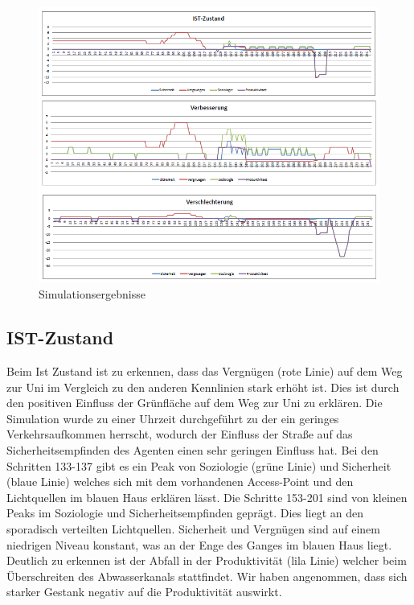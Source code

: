 \documentclass[10pt]{scrartcl}
\begin{document}
	\begin{figure}[H]
                \includegraphics[width=\textwidth]{Diagramme/Diagramme.png}
        \caption{Simulationsergebnisse}
        \label{img:Diagramme}
	\end{figure} 

\subsection{IST-Zustand}
Beim Ist Zustand ist zu erkennen, dass das Vergnügen (rote Linie) auf dem Weg zur Uni im Vergleich zu den anderen Kennlinien stark erhöht ist. Dies ist durch den positiven Einfluss der Grünfläche auf dem Weg zur Uni zu erklären. Die Simulation wurde zu einer Uhrzeit durchgeführt zu der ein geringes Verkehrsaufkommen herrscht, wodurch der Einfluss der Straße auf das Sicherheitsempfinden des Agenten einen sehr geringen Einfluss hat. Bei den Schritten 133-137 gibt es ein Peak von Soziologie (grüne Linie) und Sicherheit (blaue Linie) welches sich mit dem vorhandenen Access-Point und den Lichtquellen im blauen Haus erklären lässt. Die Schritte 153-201 sind von kleinen Peaks im Soziologie und Sicherheitsempfinden geprägt. Dies liegt an den sporadisch verteilten Lichtquellen. Sicherheit und Vergnügen sind auf einem niedrigen Niveau konstant, was an der Enge des Ganges im blauen Haus liegt. Deutlich zu erkennen ist der Abfall in der Produktivität (lila Linie) welcher beim Überschreiten des Abwasserkanals stattfindet. Wir haben angenommen, dass sich starker Gestank negativ auf die Produktivität auswirkt. 
\end{document}
